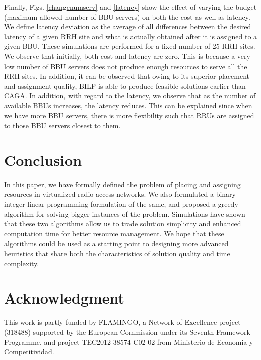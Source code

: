 \documentclass[conference]{IEEEtran}
\begin{document}
\indent Finally, Figs. \ref{changenumserv} and \ref{latency} show the effect of varying the budget (maximum allowed number of BBU servers) on both the cost as well as latency. We define latency deviation as the average of all differences between the desired latency of a given RRH site and what is actually obtained after it is assigned to a given BBU. These simulations are performed for a fixed number of 25 RRH sites. We observe that initially, both cost and latency are zero. This is because a very low number of BBU servers does not produce enough resources to serve all the RRH sites. In addition, it can be observed that owing to its superior placement and assignment quality, BILP is able to produce feasible solutions earlier than CAGA. In addition, with regard to the latency, we observe that as the number of available BBUs increases, the latency reduces. This can be explained since when we have more BBU servers, there is more flexibility such that RRUs are assigned to those BBU servers closest to them.

\section{Conclusion} \label{conc}
In this paper, we have formally defined the problem of placing and assigning resources in virtualized radio access networks. We also formulated a binary integer linear programming formulation of the same, and proposed a greedy algorithm for solving bigger instances of the problem. Simulations have shown that these two algorithms allow us to trade solution simplicity and enhanced computation time for better resource management. We hope that these algorithms could be used as a starting point to designing more advanced heuristics that share both the characteristics of solution quality and time complexity.

\section*{Acknowledgment}
This work is partly funded by FLAMINGO, a Network of Excellence project (318488) supported by the European Commission under its Seventh Framework Programme, and project TEC2012-38574-C02-02 from Ministerio de Economia y Competitividad.



\end{document}
